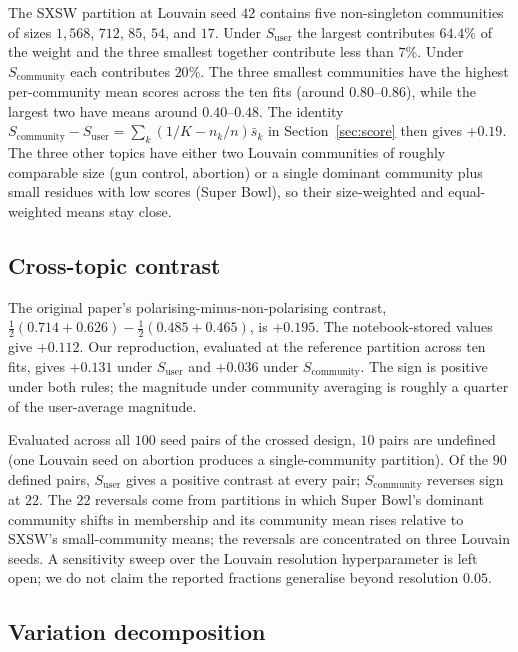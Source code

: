 The SXSW partition at Louvain seed $42$ contains five non-singleton communities of sizes $1{,}568$, $712$, $85$, $54$, and $17$. Under $S_{\mathrm{user}}$ the largest contributes $64.4\%$ of the weight and the three smallest together contribute less than $7\%$. Under $S_{\mathrm{community}}$ each contributes $20\%$. The three smallest communities have the highest per-community mean scores across the ten fits (around $0.80$--$0.86$), while the largest two have means around $0.40$--$0.48$. The identity $S_{\mathrm{community}}-S_{\mathrm{user}}=\sum_k(1/K-n_k/n)\bar s_k$ in Section~\ref{sec:score} then gives $+0.19$. The three other topics have either two Louvain communities of roughly comparable size (gun control, abortion) or a single dominant community plus small residues with low scores (Super Bowl), so their size-weighted and equal-weighted means stay close.

\subsection{Cross-topic contrast}

The original paper's polarising-minus-non-polarising contrast, $\tfrac{1}{2}(0.714+0.626)-\tfrac{1}{2}(0.485+0.465)$, is $+0.195$. The notebook-stored values give $+0.112$. Our reproduction, evaluated at the reference partition across ten fits, gives $+0.131$ under $S_{\mathrm{user}}$ and $+0.036$ under $S_{\mathrm{community}}$. The sign is positive under both rules; the magnitude under community averaging is roughly a quarter of the user-average magnitude.

Evaluated across all $100$ seed pairs of the crossed design, $10$ pairs are undefined (one Louvain seed on abortion produces a single-community partition). Of the $90$ defined pairs, $S_{\mathrm{user}}$ gives a positive contrast at every pair; $S_{\mathrm{community}}$ reverses sign at $22$. The $22$ reversals come from partitions in which Super Bowl's dominant community shifts in membership and its community mean rises relative to SXSW's small-community means; the reversals are concentrated on three Louvain seeds. A sensitivity sweep over the Louvain resolution hyperparameter is left open; we do not claim the reported fractions generalise beyond resolution $0.05$.

\subsection{Variation decomposition}

